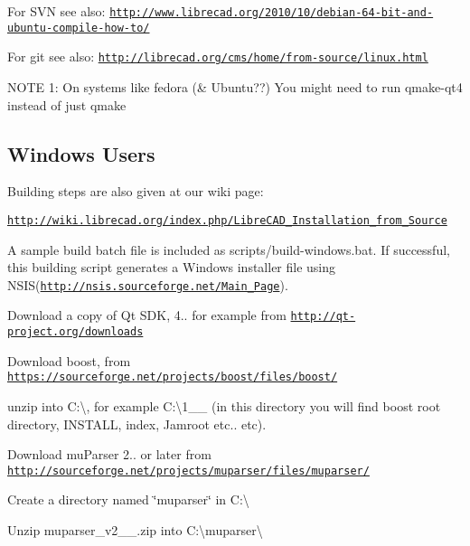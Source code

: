 For S\-V\-N see also\-: \href{http://www.librecad.org/2010/10/debian-64-bit-and-ubuntu-compile-how-to/}{\tt http\-://www.\-librecad.\-org/2010/10/debian-\/64-\/bit-\/and-\/ubuntu-\/compile-\/how-\/to/}

For git see also\-: \href{http://librecad.org/cms/home/from-source/linux.html}{\tt http\-://librecad.\-org/cms/home/from-\/source/linux.\-html}

N\-O\-T\-E 1\-: On systems like fedora (\& Ubuntu??) You might need to run qmake-\/qt4 instead of just qmake

\subsection*{Windows Users}

Building steps are also given at our wiki page\-:

\href{http://wiki.librecad.org/index.php/LibreCAD_Installation_from_Source}{\tt http\-://wiki.\-librecad.\-org/index.\-php/\-Libre\-C\-A\-D\-\_\-\-Installation\-\_\-from\-\_\-\-Source}

A sample build batch file is included as scripts/build-\/windows.\-bat. If successful, this building script generates a Windows installer file using N\-S\-I\-S(\href{http://nsis.sourceforge.net/Main_Page}{\tt http\-://nsis.\-sourceforge.\-net/\-Main\-\_\-\-Page}).


\begin{DoxyItemize}
\item Download a copy of Qt S\-D\-K, 4.. for example from \href{http://qt-project.org/downloads}{\tt http\-://qt-\/project.\-org/downloads}
\end{DoxyItemize}


\begin{DoxyItemize}
\item Download boost, from \href{https://sourceforge.net/projects/boost/files/boost/}{\tt https\-://sourceforge.\-net/projects/boost/files/boost/}
\item unzip into C\-:\textbackslash{}, for example C\-:\textbackslash{}1\-\_\-\_ (in this directory you will find boost root directory, I\-N\-S\-T\-A\-L\-L, index, Jamroot etc.. etc).
\end{DoxyItemize}


\begin{DoxyItemize}
\item Download mu\-Parser 2.. or later from \href{http://sourceforge.net/projects/muparser/files/muparser/}{\tt http\-://sourceforge.\-net/projects/muparser/files/muparser/}
\item Create a directory named \char`\"{}muparser\char`\"{} in {\ttfamily C\-:\textbackslash{}}
\item Unzip muparser\-\_\-v2\-\_\-\_.\-zip into {\ttfamily C\-:\textbackslash{}muparser\textbackslash{}}
\end{DoxyItemize}

